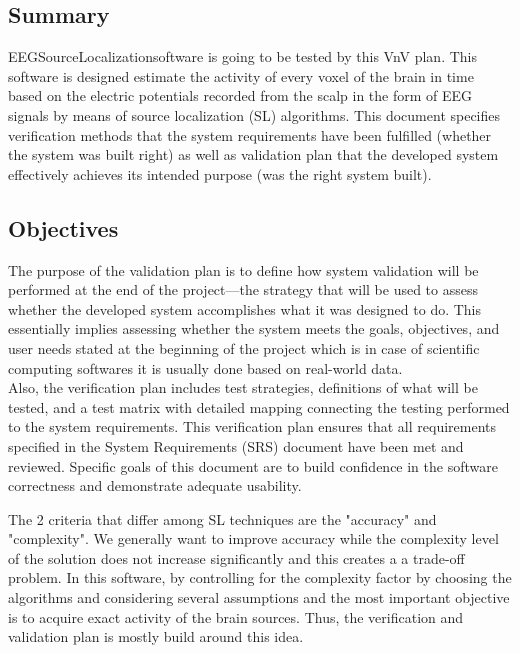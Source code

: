 \documentclass[12pt, titlepage]{article}
\renewcommand{\progname}{EEGSourceLocalization}
\begin{document}
\subsection{Summary}


\progname software is going to be tested by this VnV plan. This software is designed estimate the activity of every voxel of the brain in time based on the electric potentials recorded from the scalp in the form of EEG signals by means of source localization (SL) algorithms. This document specifies verification methods  that the system requirements have been fulfilled (whether the system was built right) as well as validation plan that the developed system effectively achieves its intended purpose (was the right system built). 

\subsection{Objectives}

The purpose of the validation plan is to define how system validation will be performed at the end of the project—the strategy that will be used to assess whether the developed system accomplishes what it was designed to do. This essentially implies assessing whether the system meets the goals, objectives, and user needs stated at the beginning of the project which is in case of scientific computing softwares it is usually done based on real-world data. \\ 

Also, the verification plan  includes test strategies, definitions of what will be tested, and a test matrix with detailed mapping connecting the testing performed to the system requirements. This verification plan ensures that all requirements specified in the System Requirements (SRS) document have been met and reviewed. Specific goals of this document are to build confidence in the software correctness and demonstrate adequate usability.

The 2 criteria that differ among SL techniques are the "accuracy" and "complexity". We generally want to improve accuracy while the complexity level of the solution does not increase significantly and this creates a a trade-off problem. In this software, by controlling for the complexity factor by choosing the algorithms and considering several assumptions and the most important objective is to acquire exact activity of the brain sources. Thus, the verification and validation plan is mostly build around this idea.
\end{document}
